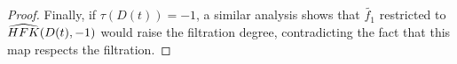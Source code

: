 \begin{proof}
 Finally, if $\tau(D(t))=-1$, a similar analysis shows that $\tilde{f_1}$ restricted to $\widehat{HFK}(D(t),-1)$ would raise the filtration degree, contradicting the fact that this map respects the filtration.








\end{proof}
